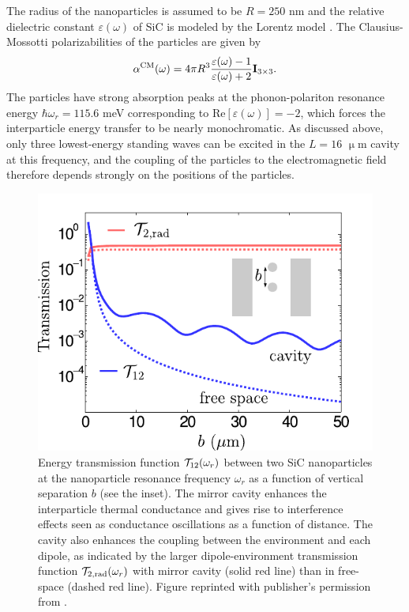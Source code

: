 The radius of the nanoparticles is assumed to be $R=250$ nm and the relative dielectric constant $\varepsilon(\omega)$ of SiC is modeled by the Lorentz model \cite{mulet01,spitzer59}. The Clausius-Mossotti polarizabilities of the particles are given by
\begin{equation}
 \alpha^{\textrm{CM}}(\omega)= 4 \pi R^3 \frac{\varepsilon(\omega)-1}{\varepsilon(\omega)+2} \mathbf{I}_{3 \times 3}.
\end{equation}
The particles have strong absorption peaks at the phonon-polariton resonance energy $\hbar \omega_r=115.6$ meV corresponding to $\textrm{Re}[\varepsilon(\omega)]=-2$, which forces the interparticle energy transfer to be nearly monochromatic. As discussed above, only three lowest-energy standing waves can be excited in the $L=16$ $\upmu$m cavity at this frequency, and the coupling of the particles to the electromagnetic field therefore depends strongly on the positions of the particles.  

\begin{figure}
 \includegraphics[width=.79\columnwidth]{pics/dipole_fig5.pdf}
 \caption{Energy transmission function $\mathcal{T}_{12}(\omega_r)$ between two SiC nanoparticles at the nanoparticle resonance frequency $\omega_r$ as a function of vertical separation $b$ (see the inset). The mirror cavity enhances the interparticle thermal conductance and gives rise to interference effects seen as conductance oscillations as a function of distance. The cavity also enhances the coupling between the environment and each dipole, as indicated by the larger dipole-environment transmission function $\mathcal{T}_{2,\textrm{rad}}(\omega_r)$ with mirror cavity (solid red line) than in free-space (dashed red line). Figure reprinted with publisher's permission from .}
\label{fig:dipole_fig5}
\end{figure}

